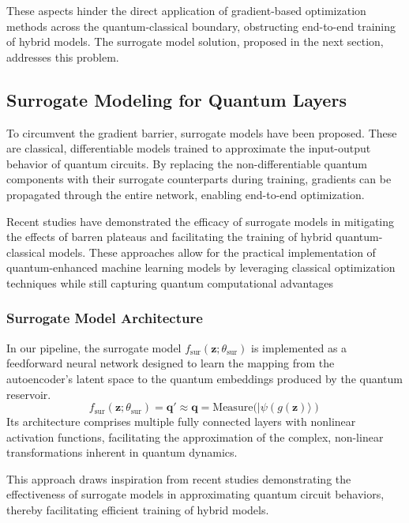 \documentclass[conference]{IEEEtran}
\begin{document}
These aspects hinder the direct application of 
gradient-based optimization methods across the 
quantum-classical boundary, obstructing end-to-end 
training of hybrid models. The surrogate model 
solution, proposed in the next section, addresses 
this problem.


\subsection{Surrogate Modeling for Quantum Layers}
To circumvent the gradient barrier, surrogate models 
have been proposed. These are classical, differentiable 
models trained to approximate the input-output behavior 
of quantum circuits. By replacing the non-differentiable 
quantum components with their surrogate counterparts during 
training, gradients can be propagated through the entire network, 
enabling end-to-end optimization. 

Recent studies have demonstrated the efficacy of 
surrogate models in mitigating the effects of barren plateaus 
and facilitating the training of hybrid quantum-classical models. 
These approaches allow for the practical implementation of 
quantum-enhanced machine learning models by leveraging classical 
optimization techniques while still capturing quantum computational 
advantages~\cite{xieQuantumSurrogateDrivenImage2025b}


\subsubsection{Surrogate Model Architecture}
In our pipeline, the surrogate model \( f_{\text{sur}}(\mathbf{z}; \theta_{\text{sur}}) \) 
is implemented as a feedforward neural network 
designed to learn the mapping 
from the autoencoder's latent space to the quantum 
embeddings produced by the quantum reservoir. 
\begin{equation}
    f_{\text{sur}}(\mathbf{z}; \theta_{\text{sur}}) = \mathbf{q}' \approx \mathbf{q} = \mathrm{Measure}(|\psi(g(\mathbf{z})\rangle)
\end{equation}
Its architecture comprises multiple fully connected 
layers with nonlinear activation functions, facilitating 
the approximation of the complex, non-linear 
transformations inherent in quantum dynamics.

This approach draws inspiration from recent studies 
demonstrating the effectiveness of surrogate models 
in approximating quantum circuit behaviors, thereby 
facilitating efficient training of hybrid 
models.~\cite{xieQuantumSurrogateDrivenImage2025b,schreiberClassicalSurrogatesQuantum2023}
\end{document}
